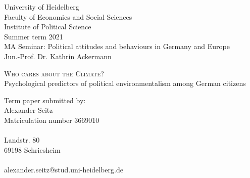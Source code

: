 \thispagestyle{empty}
\setcounter{page}{0}

\noindent
University of Heidelberg\\
Faculty of Economics and Social Sciences\\
Institute of Political Science\\
Summer term 2021\\
MA Seminar: Political attitudes and behaviours in Germany and Europe\\
Jun.-Prof. Dr. Kathrin Ackermann\\

\begin{center}

\vspace*{5cm}

\huge\textsc{Who cares about the Climate?}\\
\LARGE{Psychological predictors of political environmentalism among German citizens}\\

\vspace*{6.5cm}

\end{center}
Term paper submitted by:\\
Alexander Seitz\\
Matriculation number 3669010\\
\\
Landstr. 80\\
69198 Schriesheim\\
\\
alexander.seitz@stud.uni-heidelberg.de\\

\newpage

